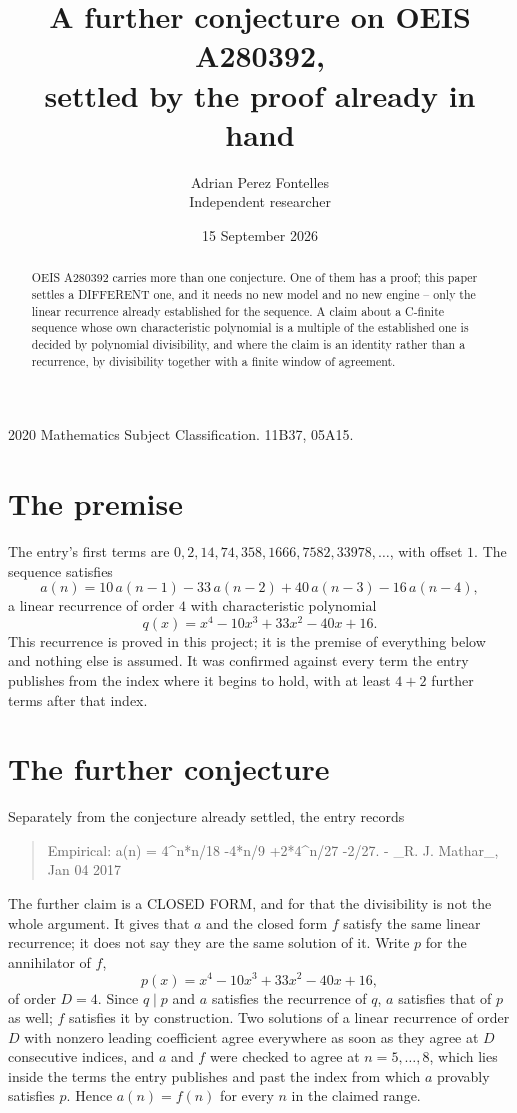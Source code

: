 \documentclass[11pt,a4paper]{article}
\title{A further conjecture on OEIS A280392,\\ \large settled by the proof already in hand}
\author{Adrian Perez Fontelles\\ \small Independent researcher}
\date{15 September 2026}
\theoremstyle{plain}
\theoremstyle{definition}
\begin{document}
\maketitle

\begin{abstract}
OEIS A280392 carries more than one conjecture. One of them has a proof; this paper settles a
DIFFERENT one, and it needs no new model and no new engine -- only the linear recurrence already
established for the sequence. A claim about a C-finite sequence whose own characteristic
polynomial is a multiple of the established one is decided by polynomial divisibility, and where
the claim is an identity rather than a recurrence, by divisibility together with a finite window
of agreement.
\end{abstract}

\noindent\small 2020 Mathematics Subject Classification. 11B37, 05A15.\normalsize

\section{The premise}

The entry's first terms are $0, 2, 14, 74, 358, 1666, 7582, 33978,\dots$, with offset $1$. The sequence satisfies
\[
  a(n)=10\,a(n-1) - 33\,a(n-2) + 40\,a(n-3) - 16\,a(n-4) ,
\]
a linear recurrence of order $4$ with characteristic polynomial
\[
  q(x)=x^{4} - 10 x^{3} + 33 x^{2} - 40 x + 16 .
\]
This recurrence is proved in this project; it is the premise of everything below and nothing else is assumed.
It was confirmed against every term the entry publishes from the index where it begins to hold,
with at least $4+2$ further terms after that index.

\section{The further conjecture}

Separately from the conjecture already settled, the entry records

\begin{quote}\raggedright Empirical: a(n) = 4\^{}n*n/18 -4*n/9 +2*4\^{}n/27 -2/27. - \_R. J. Mathar\_, Jan 04 2017\end{quote}

The further claim is a CLOSED FORM, and for that the divisibility is not the whole argument. It
gives that $a$ and the closed form $f$ satisfy the same linear recurrence; it does not say they
are the same solution of it. Write $p$ for the annihilator of $f$,
\[
  p(x)=x^{4} - 10 x^{3} + 33 x^{2} - 40 x + 16 ,
\]
of order $D=4$. Since $q\mid p$ and $a$ satisfies the recurrence of $q$, $a$ satisfies that of
$p$ as well; $f$ satisfies it by construction. Two solutions of a linear recurrence of order $D$
with nonzero leading coefficient agree everywhere as soon as they agree at $D$ consecutive
indices, and $a$ and $f$ were checked to agree at $n=5,\dots,8$,
which lies inside the terms the entry publishes and past the index from which $a$ provably
satisfies $p$. Hence $a(n)=f(n)$ for every $n$ in the claimed range.
\end{document}
